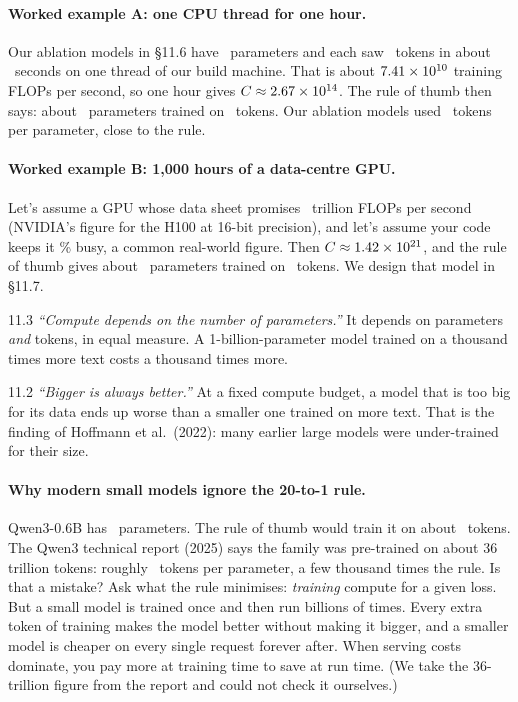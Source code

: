 \paragraph{Worked example A: one CPU thread for one hour.} Our ablation models in \S11.6 have
\nElevenAbParams\ parameters and each saw \nElevenAbTokens\ tokens in about \nElevenAbSeconds\ seconds
on one thread of our build machine. That is about $7.41\times10^{10}$ training FLOPs per second, so one
hour gives $C\approx2.67\times10^{14}$. The rule of thumb then says: about \nElevenCpuNopt\
parameters trained on \nElevenCpuDopt\ tokens. Our ablation models used \nElevenAbTokPerParam\ tokens per
parameter, close to the rule.

\paragraph{Worked example B: 1{,}000 hours of a data-centre GPU.} Let's assume a GPU whose data sheet
promises \nElevenGpuPeak\ trillion FLOPs per second (NVIDIA's figure for the H100 at 16-bit precision),
and let's assume your code keeps it \nElevenGpuMfu\% busy, a common real-world figure. Then
$C\approx1.42\times10^{21}$, and the rule of thumb gives about \nElevenGpuNopt\ parameters trained on
\nElevenGpuDopt\ tokens. We design that model in \S11.7.

\begin{wrongidea}{11.3}
\emph{``Compute depends on the number of parameters.''} It depends on parameters \emph{and} tokens, in
equal measure. A 1-billion-parameter model trained on a thousand times more text costs a thousand times
more.
\end{wrongidea}

\begin{wrongidea}{11.2}
\emph{``Bigger is always better.''} At a fixed compute budget, a model that is too big for its data ends
up worse than a smaller one trained on more text. That is the finding of Hoffmann et al.\ (2022): many
earlier large models were under-trained for their size.
\end{wrongidea}

\paragraph{Why modern small models ignore the 20-to-1 rule.} Qwen3-0.6B has \nElevenQwenParams\
parameters. The rule of thumb would train it on about \nElevenQwenChinTokens\ tokens. The Qwen3
technical report (2025) says the family was pre-trained on about 36 trillion tokens: roughly
\nElevenQwenTokPerParam\ tokens per parameter, a few thousand times the rule. Is that a mistake? Ask what
the rule minimises: \emph{training} compute for a given loss. But a small model is trained once and then
run billions of times. Every extra token of training makes the model better without making it bigger,
and a smaller model is cheaper on every single request forever after. When serving costs dominate, you
pay more at training time to save at run time. (We take the 36-trillion figure from the report and could
not check it ourselves.)

